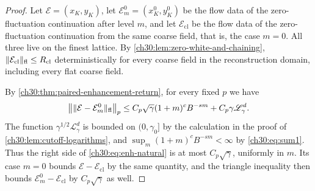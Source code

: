 \begin{proof}
Let $\mathcal E=(x_K,y_K)$, let $\mathcal E_m^0=(x_K^0,y_K^0)$ be the flow data of the zero-fluctuation continuation after level $m$, and let $\mathcal E_{\mathrm{cl}}$ be the flow data of the zero-fluctuation continuation from the same coarse field, that is, the case $m=0$. All three live on the finest lattice. By \cref{ch30:lem:zero-white-and-chaining}, $\lVert \mathcal E_{\mathrm{cl}}\rVert_{\mathrm{fl}}\le R_{\mathrm{cl}}$ deterministically for every coarse field in the reconstruction domain, including every flat coarse field.

By \cref{ch30:thm:paired-enhancement-return}, for every fixed $p$ we have
\begin{equation}\label{ch30:eq:enh-natural}
 \bigl\lVert\lVert \mathcal E-\mathcal E_m^0\rVert_{\mathrm{fl}}\bigr\rVert_p\le C_p\sqrt\gamma(1+m)^cB^{-sm}+C_p\gamma\mathscr L_\gamma^d.
\end{equation}
The function $\gamma^{1/2}\mathscr L_\gamma^d$ is bounded on $(0,\gamma_0]$ by the calculation in the proof of \cref{ch30:lem:cutoff-logarithms}, and $\sup_m(1+m)^cB^{-sm}<\infty$ by \eqref{ch30:eq:sum1}. Thus the right side of \eqref{ch30:eq:enh-natural} is at most $C_p\sqrt\gamma$, uniformly in $m$. Its case $m=0$ bounds $\mathcal E-\mathcal E_{\mathrm{cl}}$ by the same quantity, and the triangle inequality then bounds $\mathcal E_m^0-\mathcal E_{\mathrm{cl}}$ by $C_p\sqrt\gamma$ as well.


\end{proof}
